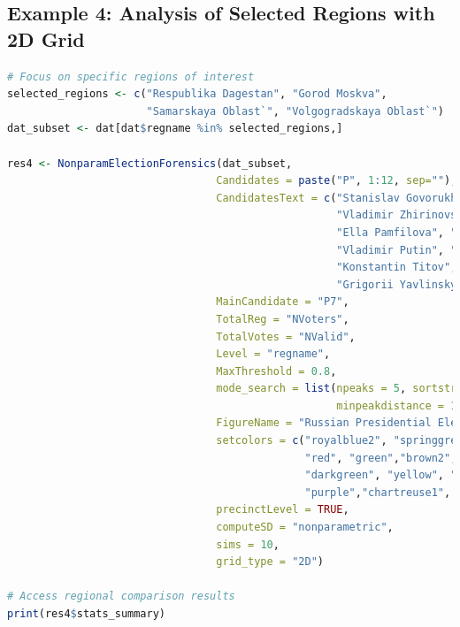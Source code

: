 \documentclass{article}
\begin{document}
\subsection{Example 4: Analysis of Selected Regions with 2D Grid}
\begin{lstlisting}[language=R]
# Focus on specific regions of interest
selected_regions <- c("Respublika Dagestan", "Gorod Moskva", 
                      "Samarskaya Oblast`", "Volgogradskaya Oblast`")  
dat_subset <- dat[dat$regname %in% selected_regions,]

res4 <- NonparamElectionForensics(dat_subset, 
                                 Candidates = paste("P", 1:12, sep=""),
                                 CandidatesText = c("Stanislav Govorukhin", "Umar Dzhabrailov",  
                                                    "Vladimir Zhirinovsky", "Gennady Zuganov", 
                                                    "Ella Pamfilova", "Alexei Podberezkin", 
                                                    "Vladimir Putin", "Yuri Skuratov",
                                                    "Konstantin Titov", "Aman Tuleev",
                                                    "Grigorii Yavlinsky", "Against All"),
                                 MainCandidate = "P7",
                                 TotalReg = "NVoters",
                                 TotalVotes = "NValid",
                                 Level = "regname",
                                 MaxThreshold = 0.8,
                                 mode_search = list(npeaks = 5, sortstr = TRUE,
                                                    minpeakdistance = 1, pick_by = "height"),
                                 FigureName = "Russian Presidential Elections, 2000",
                                 setcolors = c("royalblue2", "springgreen1","blue", 
                                               "red", "green","brown2",
                                               "darkgreen", "yellow", "lawngreen", 
                                               "purple","chartreuse1", "orange"),
                                 precinctLevel = TRUE, 
                                 computeSD = "nonparametric",
                                 sims = 10, 
                                 grid_type = "2D")

# Access regional comparison results
print(res4$stats_summary)
\end{lstlisting}
\end{document}
